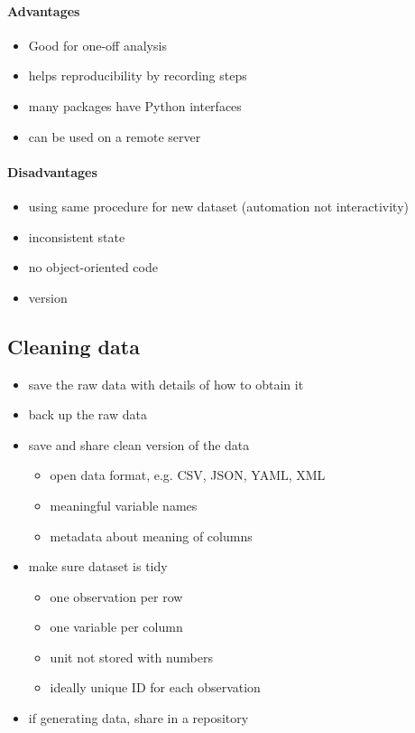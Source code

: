 \documentclass{article}
\begin{document}
\paragraph{Advantages}

\begin{itemize}
	\item Good for one-off analysis
	\item helps reproducibility by recording steps
	\item many packages have Python interfaces
	\item can be used on a remote server
\end{itemize}

\paragraph{Disadvantages}

\begin{itemize}
	\item using same procedure for new dataset (automation not interactivity)
	\item inconsistent state
	\item no object-oriented code
	\item version 
\end{itemize}

\subsection{Cleaning data}

\begin{itemize}
	\item save the raw data with details of how to obtain it
	\item back up the raw data
	\item save and share clean version of the data \begin{itemize}
		\item open data format, e.g. CSV, JSON, YAML, XML
		\item meaningful variable names
		\item metadata about meaning of columns
	\end{itemize}
	\item make sure dataset is tidy \begin{itemize}
		\item one observation per row
		\item one variable per column
		\item unit not stored with numbers
		\item ideally unique ID for each observation
	\end{itemize}
	\item if generating data, share in a repository
\end{itemize}
\end{document}
